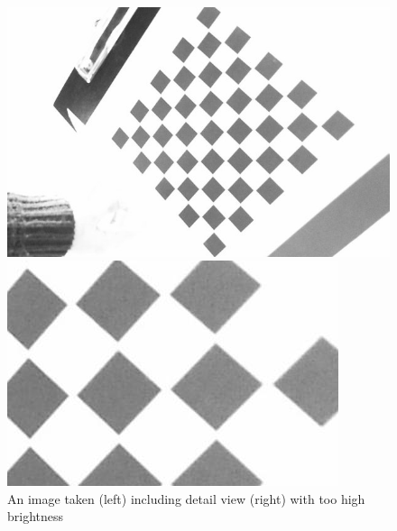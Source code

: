 \documentclass{scrartcl}
\begin{document}
\begin{figure}[H]
\centering
\begin{minipage}{.5\textwidth}
  \centering
  \includegraphics[width=.8\linewidth]{img/brightness.jpg}
\end{minipage}%
\begin{minipage}{.5\textwidth}
  \centering
  \includegraphics[width=.8\linewidth]{img/bright_detail.jpg}
\end{minipage}
\caption{An image taken (left) including detail view (right) with too high brightness}
\label{fig:brightness}
\end{figure}




\end{document}
